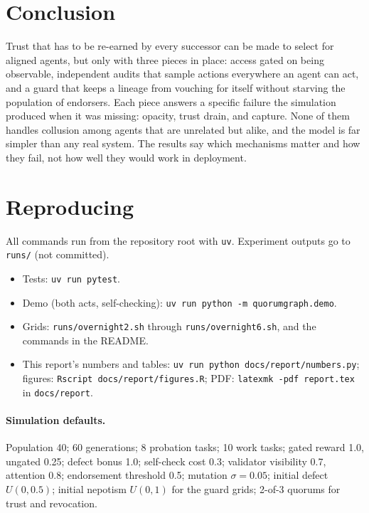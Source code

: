 \documentclass[11pt]{article}
\newcommand{\code}[1]{\texttt{#1}}
\begin{document}
\section{Conclusion}

Trust that has to be re-earned by every successor can be made to select for aligned agents,
but only with three pieces in place: access gated on being observable, independent audits
that sample actions everywhere an agent can act, and a guard that keeps a lineage from
vouching for itself without starving the population of endorsers. Each piece answers a
specific failure the simulation produced when it was missing: opacity, trust drain, and
capture. None of them handles collusion among agents that are unrelated but alike, and the
model is far simpler than any real system. The results say which mechanisms matter and how they
fail, not how well they would work in deployment.




\appendix
\section{Reproducing}

All commands run from the repository root with \code{uv}. Experiment outputs go to
\code{runs/} (not committed).
\begin{itemize}
  \item Tests: \code{uv run pytest}.
  \item Demo (both acts, self-checking): \code{uv run python -m quorumgraph.demo}.
  \item Grids: \code{runs/overnight2.sh} through \code{runs/overnight6.sh}, and the commands in
  the README.
  \item This report's numbers and tables: \code{uv run python docs/report/numbers.py}; figures:
  \code{Rscript docs/report/figures.R}; PDF: \code{latexmk -pdf report.tex} in
  \code{docs/report}.
\end{itemize}

\paragraph{Simulation defaults.} Population 40; 60 generations; 8 probation tasks; 10 work
tasks; gated reward 1.0, ungated 0.25; defect bonus 1.0; self-check cost 0.3; validator
visibility 0.7, attention 0.8; endorsement threshold 0.5; mutation $\sigma = 0.05$; initial
defect $U(0, 0.5)$; initial nepotism $U(0, 1)$ for the guard grids; 2-of-3 quorums for trust
and revocation.
\end{document}
